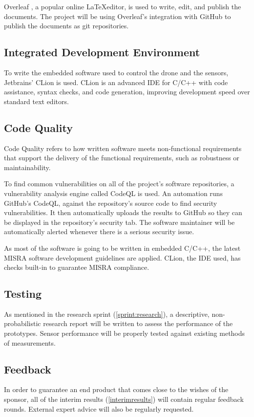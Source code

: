 \documentclass[11pt, a4paper]{article}
\begin{document}
Overleaf \cite{overleaf}, a popular online \LaTeX editor, is used to write, edit, and publish the documents. The project will be using Overleaf's integration with GitHub to publish the documents as git repositories.

\subsection{Integrated Development Environment}
To write the embedded software used to control the drone and the sensors, Jetbrains' CLion \cite{clion} is used. CLion is an advanced IDE for C/C++ with code assistance, syntax checks, and code generation, improving development speed over standard text editors.

\subsection{Code Quality}
Code Quality refers to how written software meets non-functional requirements that support the delivery of the functional requirements, such as robustness or maintainability. 

To find common vulnerabilities on all of the project's software repositories, a vulnerability analysis engine called CodeQL is used. An automation \cite{codeql} runs GitHub's CodeQL, against the repository's source code to find security vulnerabilities. It then automatically uploads the results to GitHub so they can be displayed in the repository's security tab. The software maintainer will be automatically alerted whenever there is a serious security issue.

As most of the software is going to be written in embedded C/C++, the latest MISRA  software development guidelines \cite{misra} are applied. CLion, the IDE used, has checks built-in to guarantee MISRA compliance. \cite{clion:misra}

\subsection{Testing}
As mentioned in the research sprint (\ref{sprint:research}), a descriptive, non-probabilistic research report will be written to assess the performance of the prototypes. Sensor performance will be properly tested against existing methods of measurements.

\subsection{Feedback}
In order to guarantee an end product that comes close to the wishes of the sponsor, all of the interim results (\ref{interimresults}) will contain regular feedback rounds. External expert advice will also be regularly requested.
\end{document}
